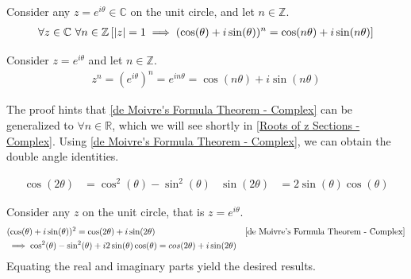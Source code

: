 \documentclass[12pt, english]{book}
\makeatletter
\renewenvironment{proof}[1][\proofname]{\par
	\pushQED{\qed}%
	\normalfont \topsep6\p@\@plus6\p@\relax
	\list{}{%
		\settowidth{\leftmargin}{\itshape\proofname:\hskip\labelsep}%
		\setlength{\labelwidth}{0pt}%
		\setlength{\itemindent}{-\leftmargin}%
	}%
	\item[\hskip\labelsep\itshape#1\@addpunct{:}]\ignorespaces
	}{ \popQED\endlist\@endpefalse}
\makeatother
\begin{document}
	\begin{theorem}
		Consider any $z = e^{i \theta} \in \mathbb{C}$ on the unit circle, and let $n \in \mathbb{Z}$.
		\begin{align*}
			\forall z\in \mathbb{C} \ \forall n \in \mathbb{Z}
			\left[\abs{z} = 1 \implies (\cos(\theta) + i\sin(\theta))^n = \cos(n \theta) + i\sin(n \theta)\right]
		\end{align*}
		\label{de Moivre's Formula Theorem - Complex}
	\end{theorem}
	\begin{proof}
		Consider $z = e^{i \theta}$ and let $n \in \mathbb{Z}$. 
		\begin{align*}
			z^n = (e^{i \theta})^n = e^{in\theta} = \cos(n\theta) + i\sin(n\theta)
		\end{align*}
	\end{proof}

	The proof hints that \cref{de Moivre's Formula Theorem - Complex} can be generalized to $\forall n \in \mathbb{R}$, which we will see shortly in \cref{Roots of z Sections - Complex}. Using \cref{de Moivre's Formula Theorem - Complex}, we can obtain the double angle identities.
	
	\begin{corollary}
		\begin{align*}
			\cos(2 \theta) &= \cos^2(\theta) - \sin^2(\theta) 
				& \sin(2\theta) &= 2\sin(\theta)\cos(\theta)
		\end{align*}
	\end{corollary}
	\begin{proof}
		Consider any $z$ on the unit circle, that is $z=e^{i\theta}$.
		\begin{align*}
			&(\cos(\theta) + i \sin(\theta))^2 = \cos(2\theta) + i \sin(2\theta)
				&\text{\Cref{de Moivre's Formula Theorem - Complex}} \\
			&\implies \cos^2(\theta) - \sin^2(\theta) + i2\sin(\theta)\cos(\theta) = cos(2\theta) + i\sin(2\theta) 
		\end{align*}
		Equating the real and imaginary parts yield the desired results. 
	\end{proof}
\end{document}
